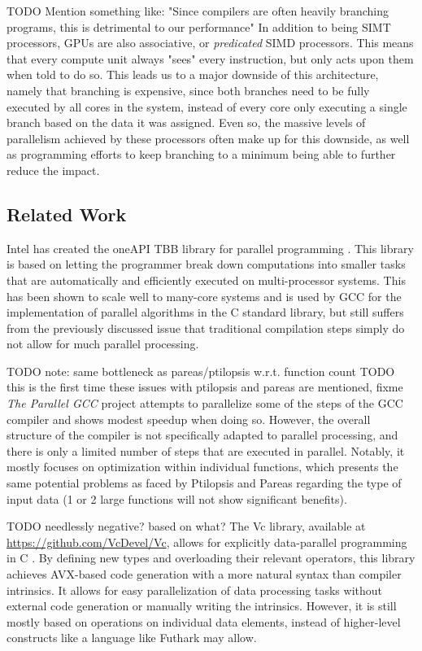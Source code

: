 \documentclass[12pt,dvipsnames]{article}
\newcommand{\helpme}[1]{{\color{red}#1}}
\newcommand{\Rplus}{\protect\hspace{-.1em}\protect\raisebox{.35ex}{\smaller{\smaller\textbf{+}}}}
\newcommand{\Cpp}{\mbox{C\Rplus\Rplus}\xspace}
\begin{document}
\helpme{TODO Mention something like: "Since compilers are often heavily branching programs, this is detrimental to our performance"}
In addition to being SIMT processors, GPUs are also associative, or \textit{predicated} SIMD processors. This means that every compute unit always "sees" every instruction, but only acts upon them when told to do so. This leads us to a major downside of this architecture, namely that branching is expensive, since both branches need to be fully executed by all cores in the system, instead of every core only executing a single branch based on the data it was assigned. Even so, the massive levels of parallelism achieved by these processors often make up for this downside, as well as programming efforts to keep branching to a minimum being able to further reduce the impact.

\subsection{Related Work}
Intel has created the oneAPI TBB library for parallel programming \cite{oneapi}. This library is based on letting the programmer break down computations into smaller tasks that are automatically and efficiently executed on multi-processor systems. This has been shown to scale well to many-core systems and is used by GCC for the implementation of parallel algorithms in the \Cpp standard library, but still suffers from the previously discussed issue that traditional compilation steps simply do not allow for much parallel processing.

\helpme{TODO note: same bottleneck as pareas/ptilopsis w.r.t. function count}
\helpme{TODO this is the first time these issues with ptilopsis and pareas are mentioned, fixme}
\textit{The Parallel GCC} project attempts to parallelize some of the steps of the GCC compiler and shows modest speedup when doing so. However, the overall structure of the compiler is not specifically adapted to parallel processing, and there is only a limited number of steps that are executed in parallel. Notably, it mostly focuses on optimization within individual functions, which presents the same potential problems as faced by Ptilopsis and Pareas regarding the type of input data (1 or 2 large functions will not show significant benefits).

\helpme{TODO needlessly negative? based on what?}
The Vc library, available at \url{https://github.com/VcDevel/Vc}, allows for explicitly data-parallel programming in \Cpp \cite{vc} \cite{Kretz2015}. By defining new types and overloading their relevant operators, this library achieves AVX-based code generation with a more natural syntax than compiler intrinsics. It allows for easy parallelization of data processing tasks without external code generation or manually writing the intrinsics. However, it is still mostly based on operations on individual data elements, instead of higher-level constructs like a language like Futhark may allow.
\end{document}
